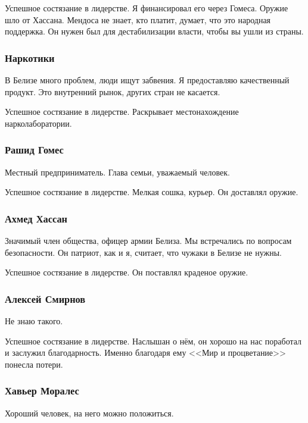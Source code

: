 \documentclass{article}
\begin{document}
Успешное состязание в лидерстве. Я финансировал его через Гомеса. Оружие
шло от Хассана. Мендоса не знает, кто платит, думает, что это народная
поддержка. Он нужен был для дестабилизации власти, чтобы вы ушли из
страны.

\subsubsection{Наркотики}\label{narcotics-valdes}

В Белизе много проблем, люди ищут забвения. Я предоставляю качественный
продукт. Это внутренний рынок, других стран не касается.

Успешное состязание в лидерстве. Раскрывает местонахождение
нарколаборатории.

\subsubsection{Рашид
Гомес}\label{rashid-gomez-valdes}

Местный предприниматель. Глава семьи, уважаемый человек.

Успешное состязание в лидерстве. Мелкая сошка, курьер. Он доставлял
оружие.

\subsubsection{Ахмед
Хассан}\label{ahmed-hassan-valdes}

Значимый член общества, офицер армии Белиза. Мы встречались по вопросам
безопасности. Он патриот, как и я, считает, что чужаки в Белизе не
нужны.

Успешное состязание в лидерстве. Он поставлял краденое оружие.

\subsubsection{Алексей
Смирнов}\label{alexey-smirnov-valdes}

Не знаю такого.

Успешное состязание в лидерстве. Наслышан о нём, он хорошо на нас
поработал и заслужил благодарность. Именно благодаря ему <<Мир и
процветание>> понесла потери.

\subsubsection{Хавьер
Моралес}\label{javier-morales}

Хороший человек, на него можно положиться.
\end{document}
